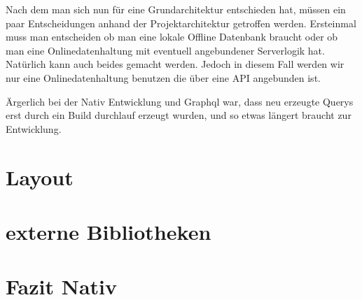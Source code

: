 Nach dem man sich nun für eine Grundarchitektur entschieden hat, müssen ein paar Entscheidungen anhand der Projektarchitektur getroffen werden. Ersteinmal muss man entscheiden ob man eine lokale Offline Datenbank braucht oder ob man eine Onlinedatenhaltung mit eventuell angebundener Serverlogik hat. Natürlich kann auch beides gemacht werden. Jedoch in diesem Fall werden wir nur eine Onlinedatenhaltung benutzen die über eine API angebunden ist. 


Ärgerlich bei der Nativ Entwicklung und Graphql war, dass neu erzeugte Querys erst durch ein Build durchlauf erzeugt wurden, und so etwas längert braucht zur Entwicklung.
\section{Layout}
\section{externe Bibliotheken}
\section{Fazit Nativ}